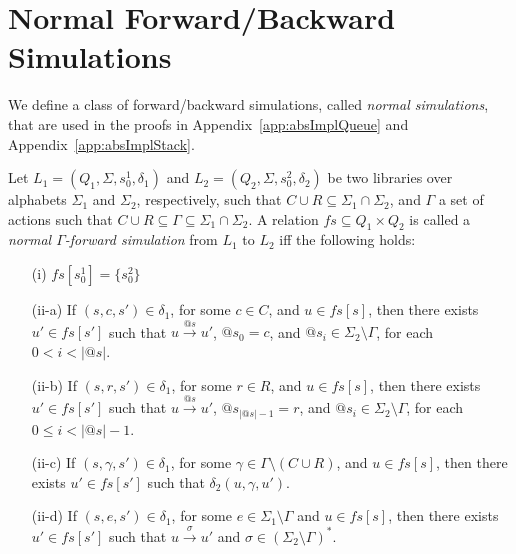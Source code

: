 \section{Normal Forward/Backward Simulations}\label{app:backSim}

We define a class of forward/backward simulations, called \emph{normal simulations}, that are used in the proofs in Appendix~\ref{app:absImplQueue} and Appendix~\ref{app:absImplStack}. 

\begin{definition}\label{def:for_app}
Let $L_1=(Q_1,\Sigma, s_0^1, \delta_1)$ and $L_2=(Q_2,\Sigma, s_0^2, \delta_2)$ be two libraries over alphabets $\Sigma_1$ and $\Sigma_2$, respectively, such that $C\cup R \subseteq \Sigma_1\cap\Sigma_2$, and $\Gamma$ a set of actions such that $C\cup R\subseteq \Gamma\subseteq \Sigma_1\cap\Sigma_2$. A relation $\mathit{fs} \subseteq Q_{1} \times Q_{2}$ is called a \emph{normal $\Gamma$-forward simulation} from $L_1$ to $L_2$ iff the following holds:
\begin{itemize}
\item[(i)] $\mathit{fs}[s_0^1] = \{s_0^2 \}$ 
\item[(ii-a)] If $(s,c,s') \in \delta_1$, for some $c\in C$, and $u \in \mathit{fs}[s]$, then there exists $u' \in \mathit{fs}[s']$ such that $u \xrightarrow{@s} u'$, $@s_0=c$, and $@s_i\in \Sigma_2\setminus\Gamma$, for each $0<i<|@s|$.
\item[(ii-b)] If $(s,r,s') \in \delta_{1}$, for some $r\in R$, and $u \in \mathit{fs}[s]$, then there exists $u' \in \mathit{fs}[s']$ such that $u \xrightarrow{@s} u'$, $@s_{|@s| -1}=r$, and $@s_i\in \Sigma_2\setminus\Gamma$, for each $0\leq i<|@s| -1$.
\item[(ii-c)] If $(s, \gamma , s') \in \delta_1$, for some $\gamma\in \Gamma\setminus (C\cup R)$, and $u \in fs[s]$, then there exists $u' \in fs[s']$ such that $\delta_2(u,\gamma, u')$. 
\item[(ii-d)] If $(s,e,s') \in \delta_1$, for some $e \in \Sigma_1\setminus \Gamma$ and $u \in \mathit{fs}[s]$, then there exists $u' \in \mathit{fs}[s']$ such that $u \xrightarrow{\sigma} u'$ and $\sigma\in (\Sigma_2\setminus\Gamma)^*$.  
\end{itemize}
\end{definition}

